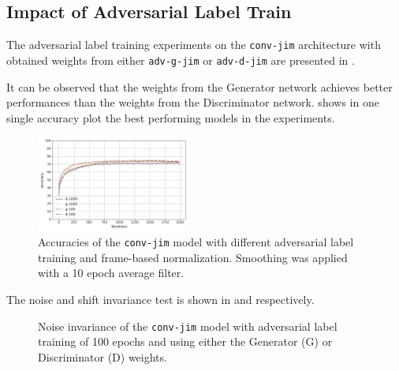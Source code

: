 \subsection{Impact of Adversarial Label Train}\label{sec:exp_adv_label}
The adversarial label training experiments on the \texttt{conv-jim} architecture with obtained weights from either \texttt{adv-g-jim} or \texttt{adv-d-jim} are presented in .

It can be observed that the weights from the Generator network achieves better performances than the weights from the Discriminator network.
 shows in one single accuracy plot the best performing models in the experiments.
\begin{figure}[!ht]
  \centering
  \includegraphics[width=0.45\textwidth]{./5_exp/figs/exp_adv_label_acc_conv-jim.png}
  \caption{Accuracies of the \texttt{conv-jim} model with different adversarial label training and frame-based normalization. Smoothing was applied  with a 10 epoch average filter.}
  \label{fig:exp_adv_label_acc_conv-jim}
\end{figure}
\FloatBarrier
\noindent
The noise and shift invariance test is shown in  and  respectively.
\begin{figure}[!ht]
  \centering
  \caption{Noise invariance of the \texttt{conv-jim} model with adversarial label training of 100 epochs and using either the Generator (G) or Discriminator (D) weights.}
  \label{fig:exp_adv_label_tb_noise_conv-jim}
\end{figure}
